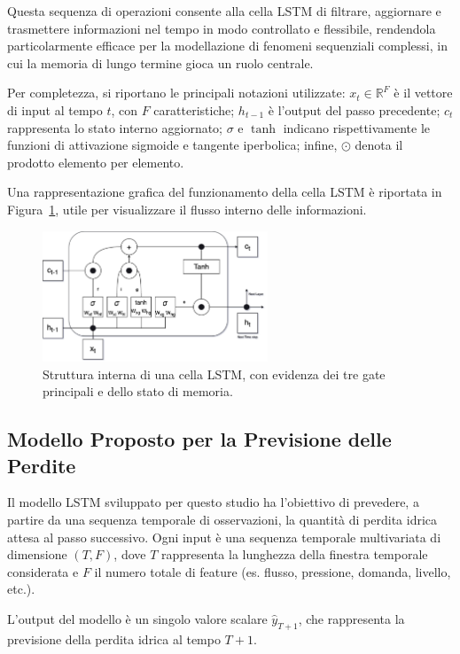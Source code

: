 \documentclass{article}
\begin{document}
Questa sequenza di operazioni consente alla cella LSTM di filtrare, aggiornare e trasmettere informazioni 
nel tempo in modo controllato e flessibile, rendendola particolarmente efficace per la modellazione di 
fenomeni sequenziali complessi, in cui la memoria di lungo termine gioca un ruolo centrale.

Per completezza, si riportano le principali notazioni utilizzate: $x_t \in \mathbb{R}^F$ è il vettore di 
input al tempo $t$, con $F$ caratteristiche; $h_{t-1}$ è l’output del passo precedente; $c_t$ rappresenta 
lo stato interno aggiornato; $\sigma$ e $\tanh$ indicano rispettivamente le funzioni di attivazione 
sigmoide e tangente iperbolica; infine, $\odot$ denota il prodotto elemento per elemento.

Una rappresentazione grafica del funzionamento della cella LSTM è riportata in Figura~\ref{fig:lstm_cell}, 
utile per visualizzare il flusso interno delle informazioni.

\begin{figure}[htbp]
    \centering
    \includegraphics[width=0.6\textwidth]{img/LSTM.png}
    \caption{Struttura interna di una cella LSTM, con evidenza dei tre gate principali e dello stato di memoria.}
    \label{fig:lstm_cell}
\end{figure}

\subsection{Modello Proposto per la Previsione delle Perdite}

Il modello LSTM sviluppato per questo studio ha l'obiettivo di prevedere, a partire da una sequenza 
temporale di osservazioni, la quantità di perdita idrica attesa al passo successivo. Ogni input è una 
sequenza temporale multivariata di dimensione $(T, F)$, dove $T$ rappresenta la lunghezza della finestra 
temporale considerata e $F$ il numero totale di feature (es. flusso, pressione, domanda, livello, etc.).

L'output del modello è un singolo valore scalare $\hat{y}_{T+1}$, che rappresenta la previsione della 
perdita idrica al tempo $T+1$.
\end{document}
